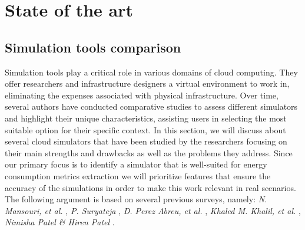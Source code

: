 
\chapter{State of the art}

\begin{citazione}
\end{citazione}
\newpage

\section{Simulation tools comparison} { 
Simulation tools play a critical role in various domains of cloud computing. They offer researchers and infrastructure designers a virtual environment to work in, eliminating the expenses associated with physical infrastructure. Over time, several authors have conducted comparative studies to assess different simulators and highlight their unique characteristics, assisting users in selecting the most suitable option for their specific context. In this section, we will discuss about several cloud simulators that have been studied by the researchers focusing on their main strengths and drawbacks as well as the problems they address. Since our primary focus is to identify a simulator that is well-suited for energy consumption metrics extraction we will prioritize features that ensure the accuracy of the simulations in order to make this work relevant in real scenarios. The following argument is based on several previous surveys, namely: \emph{N. Mansouri, et al.} \cite{mansouri2020cloud}, \emph{P. Suryateja} \cite{suryateja2016comparative}, \emph{D. Perez Abreu, et al.} \cite{abreu2020comparative}, \emph{Khaled M. Khalil, et al.} \cite{khalil2017cloud}, \emph{Nimisha Patel
\& Hiren Patel} \cite{patel2016comprehensive}.
 
}
